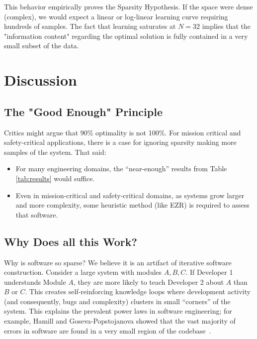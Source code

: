 \documentclass[pdflatex,sn-basic]{sn-jnl}
\begin{document}
This behavior empirically proves the Sparsity Hypothesis. If the space were 
dense (complex), we would expect a linear or log-linear learning curve 
requiring hundreds of samples. The fact that learning saturates at $N=32$ 
implies that the "information content" regarding the optimal solution is 
fully contained in a very small subset of the data.



\section{Discussion}
\subsection{The "Good Enough" Principle}
Critics might argue that 90\% optimality is not 100\%. For mission critical and safety-critical applications, there is a case for ignoring  sparsity making more samples of the system.
That said:
\begin{itemize}
\item For many engineering domains, the ``near-enough'' results from Table \ref{tab:results} would suffice.
\item Even in mission-critical and safety-critical domains, as   systems grow larger and more complexity, some heuristic method  (like EZR) is required to assess that software.    
\end{itemize}
 


\subsection{Why Does all this Work?}
Why is software so sparse? We believe it is an artifact of iterative 
software construction. 
Consider a large system with modules $A, B, C$. If Developer 1 understands
Module $A$, they are more likely to teach Developer 2 about $A$ than $B$ or
$C$. This creates self-reinforcing knowledge loops where development activity
(and consequently, bugs and complexity) clusters in small ``corners'' of the
system. This explains the prevalent power laws in software engineering; for
example, Hamill and Goseva-Popstojanova showed that the vast majority of errors
in software are found in a very small region of the codebase~\citep{Hamill09}.
 
\end{document}

